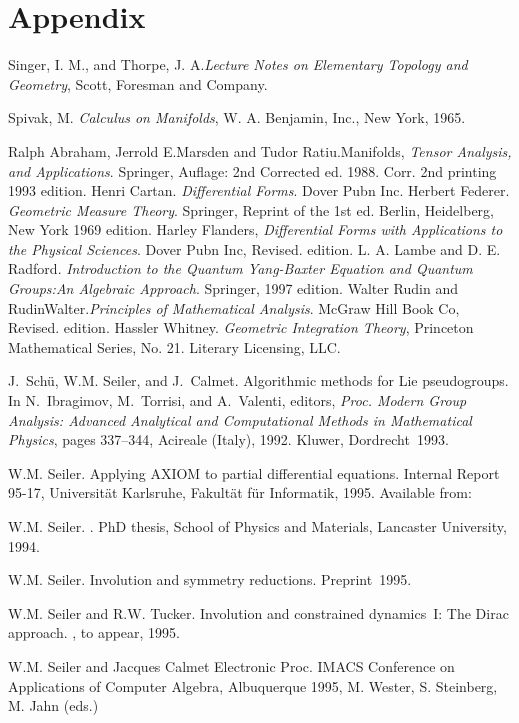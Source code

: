 \documentclass[12pt,a4paper]{article}
\begin{document}
\section{Appendix}
%
\begin{thebibliography}{1}
%
 Singer, I. M., and Thorpe, J. A.{\em Lecture Notes on 
  Elementary Topology and Geometry}, Scott, Foresman and Company. 

 Spivak, M. {\em Calculus on Manifolds}, W. A. Benjamin, 
  Inc., New York, 1965. 

 Ralph Abraham, Jerrold E.Marsden and Tudor Ratiu.Manifolds, 
       {\em Tensor Analysis, and Applications}. Springer,
       Auflage: 2nd Corrected ed. 1988. Corr. 2nd printing 1993 edition.
%       
 Henri Cartan. {\em Differential Forms}. Dover Pubn Inc.
%
 Herbert Federer. {\em Geometric Measure Theory}. Springer, 
       Reprint of the 1st ed. Berlin, Heidelberg, New York 1969 edition.
%
 Harley Flanders, {\em Differential Forms with Applications to 
       the Physical Sciences}. Dover Pubn Inc, Revised. edition.
%
 L. A. Lambe and D. E. Radford. {\em Introduction to the 
       Quantum Yang-Baxter Equation and Quantum Groups:An Algebraic Approach}.
       Springer, 1997 edition.
%
 Walter Rudin and RudinWalter.{\em Principles of Mathematical
       Analysis}. McGraw Hill Book Co, Revised. edition.
%
 Hassler Whitney. {\em Geometric Integration Theory}, 
       Princeton Mathematical Series, No. 21. Literary Licensing, LLC.


J.~Sch\"u, W.M. Seiler, and J.~Calmet.
\newblock Algorithmic methods for {L}ie pseudogroups.
\newblock In N.~Ibragimov, M.~Torrisi, and A.~Valenti, editors, {\em Proc.
  Modern Group Analysis: Advanced Analytical and Computational Methods in
  Mathematical Physics}, pages 337--344, Acireale (Italy), 1992. Kluwer,
  Dordrecht~1993.

W.M. Seiler.
\newblock Applying {AXIOM} to partial differential equations.
\newblock Internal Report 95-17, Universit\"at Karlsruhe, Fakult\"at f\"ur
  Informatik, 1995. Available from:

W.M. Seiler.
.
\newblock PhD thesis, School of Physics and Materials, Lancaster University,
  1994.

W.M. Seiler.
\newblock Involution and symmetry reductions.
\newblock Preprint~1995.

W.M. Seiler and R.W. Tucker.
\newblock Involution and constrained dynamics~{I}: The {D}irac approach.
, to appear, 1995.

W.M. Seiler and  Jacques Calmet
Electronic Proc. IMACS Conference on Applications of Computer Algebra, 
Albuquerque 1995, M. Wester, S. Steinberg, M. Jahn (eds.)
\end{thebibliography}
%
\end{document}
